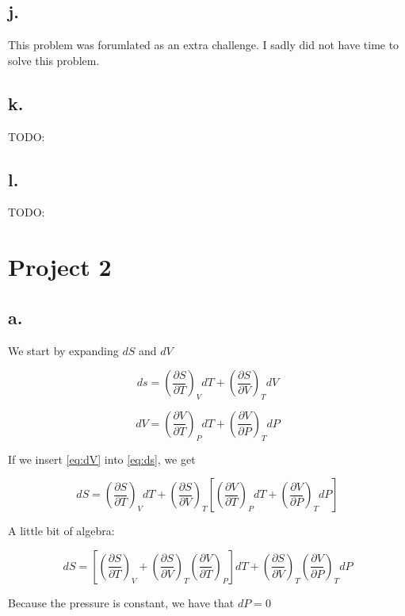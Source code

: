 \documentclass{article}
\newcommand{\pd}[2]{\frac{\partial #1}{\partial #2}}
\begin{document}
\subsection*{j.}
  This problem was forumlated as an extra challenge. I sadly did not have time to solve this problem.

\subsection*{k.}

TODO: 

\subsection*{l.}

TODO:

\section*{Project 2}

\subsection*{a.}

We start by expanding $dS$ and $dV$

\begin{equation}
ds = \left(\pd{S}{T}\right)_V dT + \left(\pd{S}{V}\right)_T dV
\label{eq:ds}
\end{equation}

\begin{equation}
dV = \left(\pd{V}{T}\right)_P dT + \left(\pd{V}{P}\right)_T dP
\label{eq:dV}
\end{equation}

If we insert \eqref{eq:dV} into \eqref{eq:ds}, we get

\begin{equation}
dS = \left(\pd{S}{T}\right)_V dT + \left(\pd{S}{V}\right)_T\left[\left(\pd{V}{T}\right)_P dT + \left(\pd{V}{P}\right)_T dP\right]
\end{equation}

A little bit of algebra:

\begin{equation}
dS = \left[\left(\pd{S}{T}\right)_V + \left(\pd{S}{V}\right)_T\left(\pd{V}{T}\right)_P\right]dT + \left(\pd{S}{V}\right)_T\left(\pd{V}{P}\right)_T dP
\end{equation}

Because the pressure is constant, we have that $dP = 0$
\end{document}
